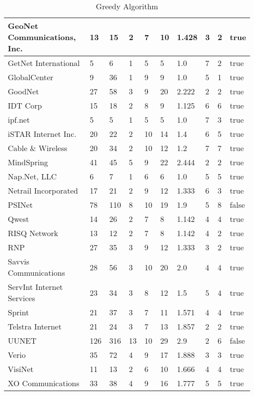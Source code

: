 \documentclass [12pt]{article}
\begin{document}
\begin{table}[H]
\begin{tabular}{ | l | l | l | l | l | l | l | l | l | l | }
    GeoNet Communications, Inc. & 13 & 15 & 2 & 7 & 10 & 1.428 & 3 & 2 & true\\ \hline
    GetNet International & 5 & 6 & 1 & 5 & 5 & 1.0 & 7 & 2 & true\\ \hline
    GlobalCenter & 9 & 36 & 1 & 9 & 9 & 1.0 & 5 & 1 & true\\ \hline
    GoodNet & 27 & 58 & 3 & 9 & 20 & 2.222 & 2 & 2 & true\\ \hline
    IDT Corp & 15 & 18 & 2 & 8 & 9 & 1.125 & 6 & 6 & true\\ \hline
    ipf.net & 5 & 5 & 1 & 5 & 5 & 1.0 & 7 & 3 & true\\ \hline
    iSTAR Internet Inc. & 20 & 22 & 2 & 10 & 14 & 1.4 & 6 & 5 & true\\ \hline
    Cable \& Wireless & 20 & 34 & 2 & 10 & 12 & 1.2 & 7 & 7 & true\\ \hline
    MindSpring & 41 & 45 & 5 & 9 & 22 & 2.444 & 2 & 2 & true\\ \hline
    Nap.Net, LLC & 6 & 7 & 1 & 6 & 6 & 1.0 & 5 & 5 & true\\ \hline
    Netrail Incorporated & 17 & 21 & 2 & 9 & 12 & 1.333 & 6 & 3 & true\\ \hline
    PSINet & 78 & 110 & 8 & 10 & 19 & 1.9 & 5 & 8 & false\\ \hline
    Qwest & 14 & 26 & 2 & 7 & 8 & 1.142 & 4 & 4 & true\\ \hline
    RISQ Network & 13 & 12 & 2 & 7 & 8 & 1.142 & 4 & 2 & true\\ \hline
    RNP & 27 & 35 & 3 & 9 & 12 & 1.333 & 3 & 2 & true\\ \hline
    Savvis Communications & 28 & 56 & 3 & 10 & 20 & 2.0 & 4 & 4 & true\\ \hline
    ServInt Internet Services & 23 & 34 & 3 & 8 & 12 & 1.5 & 5 & 4 & true\\ \hline
    Sprint & 21 & 37 & 3 & 7 & 11 & 1.571 & 4 & 4 & true\\ \hline
    Telstra Internet & 21 & 24 & 3 & 7 & 13 & 1.857 & 2 & 2 & true\\ \hline
    UUNET & 126 & 316 & 13 & 10 & 29 & 2.9 & 2 & 6 & false\\ \hline
    Verio & 35 & 72 & 4 & 9 & 17 & 1.888 & 3 & 3 & true\\ \hline
    VisiNet & 11 & 13 & 2 & 6 & 10 & 1.666 & 4 & 4 & true\\ \hline
    XO Communications & 33 & 38 & 4 & 9 & 16 & 1.777 & 5 & 5 & true\\ \hline
 \end{tabular}
 \caption{Greedy Algorithm}
 \label{table:greedyloc}
 \end{table}
  
\end{document}
